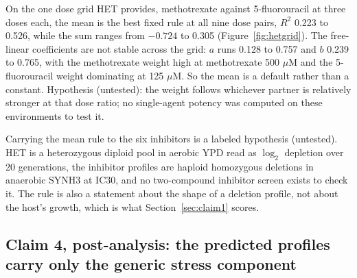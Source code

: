 
 On the one dose grid HET provides, methotrexate
against 5-fluorouracil at three doses each, the mean is the best fixed rule at all nine
dose pairs, $R^2$ 0.223 to 0.526, while the sum ranges from $-0.724$ to 0.305
(Figure~\ref{fig:hetgrid}). The free-linear coefficients are not stable across the grid:
$a$ runs 0.128 to 0.757 and $b$ 0.239 to 0.765, with the methotrexate weight high at
methotrexate 500 $\mu$M and the 5-fluorouracil weight dominating at 125 $\mu$M. So the
mean is a default rather than a constant. Hypothesis (untested): the weight follows
whichever partner is relatively stronger at that dose ratio; no single-agent potency was
computed on these environments to test it.


Carrying the mean rule to the six inhibitors is a labeled hypothesis (untested). HET is a
heterozygous diploid pool in aerobic YPD read as $\log_2$ depletion over 20 generations,
the inhibitor profiles are haploid homozygous deletions in anaerobic SYNH3 at IC30, and
no two-compound inhibitor screen exists to check it. The rule is also a statement about
the shape of a deletion profile, not about the host's growth, which is what
Section~\ref{sec:claim1} scores.

\subsection{Claim 4, post-analysis: the predicted profiles carry only the generic stress
component}
\label{sec:claim4}

